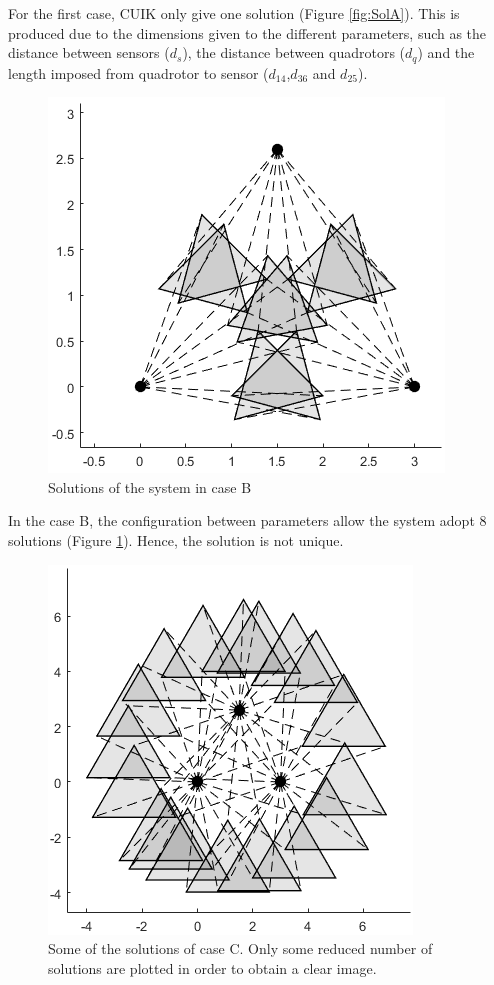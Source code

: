 \documentclass[paper=a4, fontsize=11pt]{scrartcl} %
\begin{document}
For the first case, CUIK only give one solution (Figure \ref{fig:SolA}). This is produced due to the dimensions given to the different parameters, such as the distance between sensors ($d_s$), the distance between quadrotors ($d_q$) and the length imposed from quadrotor to sensor ($d_{14}$,$d_{36}$ and $d_{25}$).   

\begin{figure}[H]
	\begin{center}
		\includegraphics[width=0.5\linewidth]{SolB.png} 
	\caption{Solutions of the system in case B}
	\label{fig:SolB}
	\end{center}
\end{figure}

In the case B, the configuration between parameters allow the system adopt 8 solutions (Figure \ref{fig:SolB}). Hence, the solution is not unique.

\begin{figure}[H]
	\begin{center}
		\includegraphics[width=0.6\linewidth]{SolC.png} 
	\caption{Some of the solutions of case C. Only some reduced number of solutions are plotted in order to obtain a clear image.}
	\label{fig:SolC}
	\end{center}
\end{figure}
\end{document}
